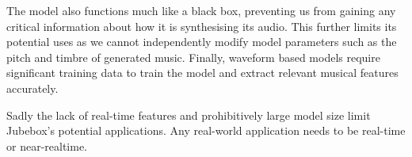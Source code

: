 The model also functions much like a black box, preventing us from gaining any critical information about how it is synthesising its audio. This further limits its potential uses as we cannot independently modify model parameters such as the pitch and timbre of generated music. Finally, waveform based models require significant training data to train the model and extract relevant musical features accurately.

Sadly the lack of real-time features and prohibitively large model size limit Jubebox's potential applications. Any real-world application needs to be real-time or near-realtime.